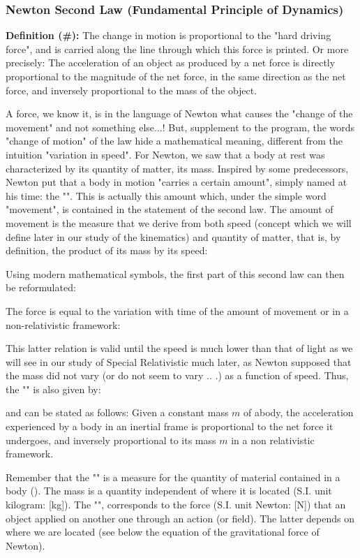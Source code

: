 	\subsubsection{Newton Second Law (Fundamental Principle of Dynamics)}
	\textbf{Definition (\#\mydef):} The change in motion is proportional to the "hard driving force", and is carried along the line through which this force is printed. Or more precisely: The acceleration of an object as produced by a net force is directly proportional to the magnitude of the net force, in the same direction as the net force, and inversely proportional to the mass of the object.
	
	A force, we know it, is in the language of Newton what causes the "change of the movement" and not something else...! But, supplement to the program, the words "change of motion" of the law hide a mathematical meaning, different from the intuition "variation in speed". For Newton, we saw that a body at rest was characterized by its quantity of matter, its mass. Inspired by some predecessors, Newton put that a body in motion "carries a certain amount", simply named at his time: the "". This is actually this amount which, under the simple word "movement", is contained in the statement of the second law. The amount of movement is the measure that we derive from both speed (concept which we will define later in our study of the kinematics) and quantity of matter, that is, by definition, the product of its mass by its speed:
	
	Using modern mathematical symbols, the first part of this second law can then be reformulated:
	
	The force is equal to the variation with time of the amount of movement or in a non-relativistic framework:
	
	This latter relation is valid until the speed is much lower than that of light as we will see in our study of Special Relativistic much later, as Newton supposed that the mass did not vary (or do not seem to vary .. .) as a function of speed. Thus, the "" is also given by:
	
	and can be stated as follows: Given a constant mass $m$ of abody, the acceleration experienced by a body in an inertial frame is proportional to the net force it undergoes, and inversely proportional to its mass $m$ in a non relativistic framework.
	
	Remember that the "" is a measure for the quantity of material contained in a body (). The mass is a quantity independent of where it is located (S.I. unit kilogram: [kg]). The "", corresponds to the force (S.I. unit Newton: [N]) that an object applied on another one through an action (or field). The latter depends on where we are located (see below the equation of the gravitational force of Newton).
	
